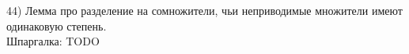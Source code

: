 44) Лемма про разделение на сомножители, чьи неприводимые множители имеют одинаковую степень.\\

Шпаргалка: TODO\\
